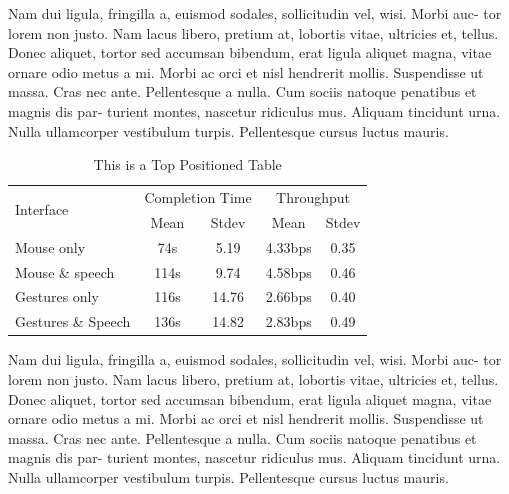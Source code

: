 Nam dui ligula, fringilla a, euismod sodales, sollicitudin vel, wisi. Morbi auc-
tor lorem non justo. Nam lacus libero, pretium at, lobortis vitae, ultricies et, tellus.
Donec aliquet, tortor sed accumsan bibendum, erat ligula aliquet magna, vitae ornare
odio metus a mi. Morbi ac orci et nisl hendrerit mollis. Suspendisse ut massa. Cras
nec ante. Pellentesque a nulla. Cum sociis natoque penatibus et magnis dis par-
turient montes, nascetur ridiculus mus. Aliquam tincidunt urna. Nulla ullamcorper
vestibulum turpis. Pellentesque cursus luctus mauris.

\begin{table}[!t]
  \centering
  \caption{This is a Top Positioned Table}
  \begin{tabular}{ l c c c c }
    \hline
    \multirow{2}{*}{Interface} &
    \multicolumn{2}{c}{Completion Time} &
    \multicolumn{2}{c}{Throughput} \\
    
    {} & Mean & Stdev & Mean & Stdev \\ 
    \hline
    Mouse only & 74s & 5.19 & 4.33bps & 0.35 \\
    Mouse \& speech & 114s & 9.74 & 4.58bps & 0.46 \\
    Gestures only & 116s & 14.76 & 2.66bps & 0.40\\
    Gestures \& Speech & 136s & 14.82 & 2.83bps & 0.49\\
    \hline
  \end{tabular}
  \label{tab:ranking}
\end{table}


Nam dui ligula, fringilla a, euismod sodales, sollicitudin vel, wisi. Morbi auc-
tor lorem non justo. Nam lacus libero, pretium at, lobortis vitae, ultricies et, tellus.
Donec aliquet, tortor sed accumsan bibendum, erat ligula aliquet magna, vitae ornare
odio metus a mi. Morbi ac orci et nisl hendrerit mollis. Suspendisse ut massa. Cras
nec ante. Pellentesque a nulla. Cum sociis natoque penatibus et magnis dis par-
turient montes, nascetur ridiculus mus. Aliquam tincidunt urna. Nulla ullamcorper
vestibulum turpis. Pellentesque cursus luctus mauris.
